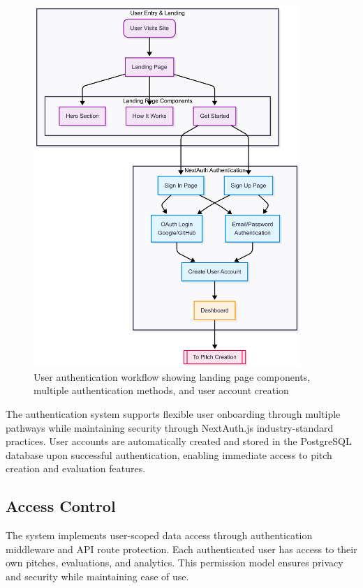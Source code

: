 \begin{figure}[H]
  \centering
  \includegraphics[width=0.9\textwidth]{img/user-flow-auth}
  \caption{User authentication workflow showing landing page components, multiple authentication methods, and user account creation}
  \label{fig:user-flow-auth}
\end{figure}

The authentication system supports flexible user onboarding through multiple pathways while maintaining security through NextAuth.js industry-standard practices. User accounts are automatically created and stored in the PostgreSQL database upon successful authentication, enabling immediate access to pitch creation and evaluation features.

\subsection{Access Control}
The system implements user-scoped data access through authentication middleware and API route protection. Each authenticated user has access to their own pitches, evaluations, and analytics. This permission model ensures privacy and security while maintaining ease of use.

